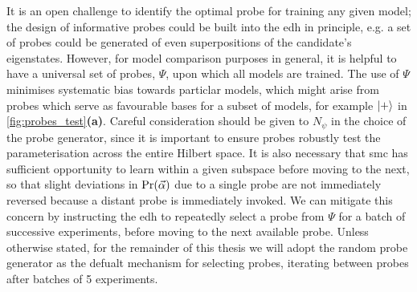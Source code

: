 It is an open challenge to identify the optimal \gls{probe} for training any given model;
    the design of informative probes could be built into the \gls{edh} in principle,
    e.g. a set of \glspl{probe} could be generated of even superpositions of the candidate's eigenstates.
However, for model comparison purposes in general, 
    it is helpful to have a universal set of probes, $\Psi$, upon which all models are trained. 
The use of $\Psi$ minimises systematic bias towards particlar models, 
    which might arise from probes which serve as favourable bases for a subset of models, 
    for example $\ket{+}$ in \cref{fig:probes_test}\textbf{(a)}. 
Careful consideration should be given to $N_{\psi}$ in the choice of the \gls{probe} generator, 
    since it is important to ensure probes robustly test the parameterisation across the entire Hilbert space.
It is also necessary that \gls{smc} has sufficient opportunity to learn within a given subspace before moving to the next, 
    so that slight deviations in $\Pr(\vec{\alpha})$ due to a single probe are not immediately reversed because a distant probe is immediately invoked. 
We can mitigate this concern by instructing the \gls{edh} to repeatedly select a \gls{probe} from $\Psi$ for a batch of successive \glspl{experiment}, 
    before moving to the next available probe. 
Unless otherwise stated, for the remainder of this thesis we will adopt the random \gls{probe} 
    generator as the defualt mechanism for selecting probes,
    iterating between probes after batches of 5 \glspl{experiment}.
